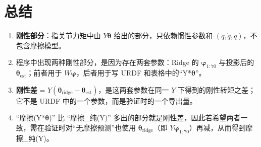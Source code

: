 \documentclass[12pt,a4paper]{article}
\begin{document}
\section{总结}

\begin{enumerate}[leftmargin=*]
  \item \textbf{刚性部分}：指关节力矩中由 $Y\bm{\theta}$ 给出的部分，只依赖惯性参数和 $(q,\dot{q},\ddot{q})$，不包含摩擦模型。
  \item 程序中出现两种刚性部分，是因为存在两套参数：Ridge 的 $\bm{\varphi}_{1:70}$ 与投影后的 $\bm{\theta}_{\mathrm{est}}$；前者用于 $W\bm{\varphi}$，后者用于写 URDF 和表格中的``Y*$\bm{\theta}$''。
  \item \textbf{刚性差} = $Y(\bm{\theta}_{\mathrm{ridge}} - \bm{\theta}_{\mathrm{est}})$，是这两套参数在同一 $Y$ 下得到的刚性转矩之差；它不是 URDF 中的一个参数，而是验证时的一个导出量。
  \item ``摩擦(Y*$\bm{\theta}$)'' 比 ``摩擦\_纯(Y)'' 多出的部分就是刚性差，因此若希望两者一致，需在验证时对``无摩擦预测''也使用 $\bm{\theta}_{\mathrm{ridge}}$（即 $Y\bm{\varphi}_{1:70}$）再减，从而得到摩擦\_纯(Y)。
\end{enumerate}
\end{document}
